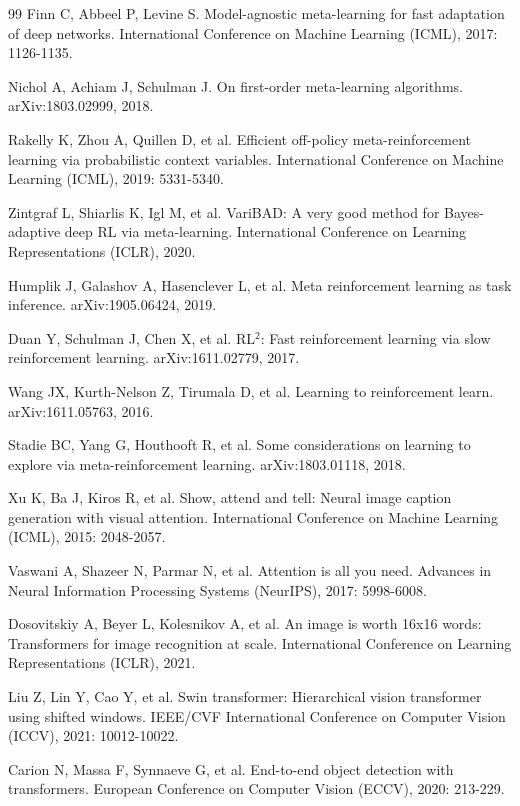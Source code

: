 \documentclass[12pt,a4paper]{ctexart}
\begin{document}
\begin{thebibliography}{99}
 Finn C, Abbeel P, Levine S. Model-agnostic meta-learning for fast adaptation of deep networks. International Conference on Machine Learning (ICML), 2017: 1126-1135.

 Nichol A, Achiam J, Schulman J. On first-order meta-learning algorithms. arXiv:1803.02999, 2018.

 Rakelly K, Zhou A, Quillen D, et al. Efficient off-policy meta-reinforcement learning via probabilistic context variables. International Conference on Machine Learning (ICML), 2019: 5331-5340.

 Zintgraf L, Shiarlis K, Igl M, et al. VariBAD: A very good method for Bayes-adaptive deep RL via meta-learning. International Conference on Learning Representations (ICLR), 2020.

 Humplik J, Galashov A, Hasenclever L, et al. Meta reinforcement learning as task inference. arXiv:1905.06424, 2019.

 Duan Y, Schulman J, Chen X, et al. RL$^2$: Fast reinforcement learning via slow reinforcement learning. arXiv:1611.02779, 2017.

 Wang JX, Kurth-Nelson Z, Tirumala D, et al. Learning to reinforcement learn. arXiv:1611.05763, 2016.

 Stadie BC, Yang G, Houthooft R, et al. Some considerations on learning to explore via meta-reinforcement learning. arXiv:1803.01118, 2018.

 Xu K, Ba J, Kiros R, et al. Show, attend and tell: Neural image caption generation with visual attention. International Conference on Machine Learning (ICML), 2015: 2048-2057.

 Vaswani A, Shazeer N, Parmar N, et al. Attention is all you need. Advances in Neural Information Processing Systems (NeurIPS), 2017: 5998-6008.

 Dosovitskiy A, Beyer L, Kolesnikov A, et al. An image is worth 16x16 words: Transformers for image recognition at scale. International Conference on Learning Representations (ICLR), 2021.

 Liu Z, Lin Y, Cao Y, et al. Swin transformer: Hierarchical vision transformer using shifted windows. IEEE/CVF International Conference on Computer Vision (ICCV), 2021: 10012-10022.

 Carion N, Massa F, Synnaeve G, et al. End-to-end object detection with transformers. European Conference on Computer Vision (ECCV), 2020: 213-229.


\end{thebibliography}
\end{document}
